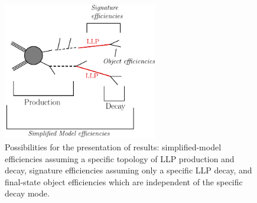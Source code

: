\begin{figure}[t]
\begin{center}
\includegraphics[width=0.6\textwidth,angle=0]{ch5-figures/LLPdiagramScheme.pdf}
\end{center}
\caption{Possibilities for the presentation of results:
simplified-model efficiencies assuming a specific topology of LLP production and decay,
signature efficiencies assuming only a specific LLP decay, and final-state object efficiencies which are
independent of the specific decay mode.
}
\label{fig:ch5_presentation_options}
\end{figure}



